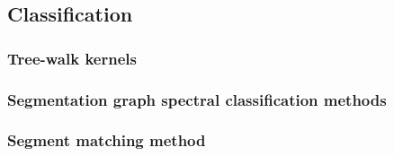 \subsection{Classification}
\subsubsection{Tree-walk kernels}
\subsubsection{Segmentation graph spectral classification methods}
\subsubsection{Segment matching method}